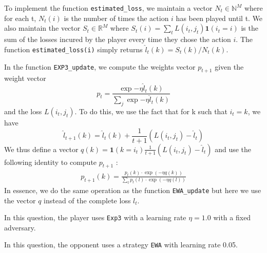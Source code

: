  To implement the function \texttt{estimated\_loss}, we maintain a vector $N_t \in \mathbb{N}^M$ where for each t, $N_t(i)$ is the number of times the action $i$ has been played until t. We also maintain the vector $S_t \in \mathbb{R}^M$ where $S_t(i) = \sum_t L(i_t, j_t) \mathbf{1}(i_t = i)$ is the sum of the losses incured by the player every time they chose the action $i$.
The function \texttt{estimated\_loss(i)} simply returns $\hat{l}_t(k) = S_t(k) / N_t(k)$.

 In the function \texttt{EXP3\_update}, we compute the weights vector $p_{t+1}$ given the weight vector 
$$
p_t = \frac{\exp{- \eta \hat{l}_t(k)}}{\sum_j \exp{- \eta \hat{l}_t(k)}}
$$
and the loss $L(i_t, j_t)$. To do this, we use the fact that for k such that $i_t = k$, we have 
$$
\hat{l}_{t+1}(k) = \hat{l}_{t}(k) + \frac{1}{t+1}(L(i_t, j_t) - \hat{l}_t)
$$
We thus define a vector $q(k) = \mathbf{1}(k = i_t)\frac{1}{t+1}(L(i_t, j_t) - \hat{l}_t)$ and use the following identity to compute $p_{t+1}$ :
\begin{align*}
	p_{t+1}(k) = \frac{p_t(k) \cdot \exp{(- \eta q(k))}}{\sum_l p_t(l) \cdot \exp{(- \eta q(l))}}
\end{align*}
In essence, we do the same operation as the function \texttt{EWA\_update} but here we use the vector $q$ instead of the complete loss $l_t$.

 In this question, the player uses \texttt{Exp3} with a learning rate $\eta = 1.0$ with a fixed adversary.

 In this question, the opponent uses a strategy \texttt{EWA} with learning rate 0.05. 